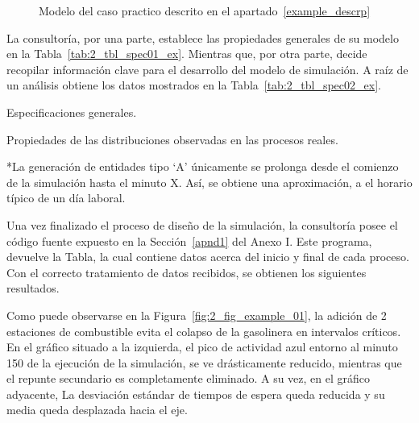 \begin{figure}
	\begin{center}
		
	\end{center}
	\caption{Modelo del caso practico descrito en el apartado~\ref{example_descrp}}
		\label{fig:2_fc_complex_ex}
\end{figure}

La consultoría, por una parte, establece
las propiedades generales de su modelo en la Tabla~\ref{tab:2_tbl_spec01_ex}.
Mientras que, por otra parte, decide recopilar información clave
para el desarrollo del modelo de simulación.
A raíz de un análisis obtiene los datos mostrados en la Tabla~\ref{tab:2_tbl_spec02_ex}.

\begin{table}
	\centering
	\caption{Especificaciones generales.}
	
	\label{tab:2_tbl_spec01_ex}
\end{table}
	
\begin{table}
	\centering
	\caption{Propiedades de las distribuciones observadas en las procesos reales.}
	
	\footnotesize{*La generación de entidades tipo `A' únicamente se prolonga desde el comienzo de la simulación hasta el minuto X.
	Así, se obtiene una aproximación, a el horario típico de un día laboral.}
	\label{tab:2_tbl_spec02_ex}
\end{table}

Una vez finalizado el proceso de diseño de la simulación,
la consultoría posee el código fuente expuesto en la
Sección~\ref{apnd1} del Anexo I.
Este programa, devuelve la Tabla,
la cual contiene datos acerca del inicio y final de cada proceso.
Con el correcto tratamiento de datos recibidos,
se obtienen los siguientes resultados.

Como puede observarse en la Figura~\ref{fig:2_fig_example_01},
la adición de 2 estaciones de combustible
evita el colapso de la gasolinera en intervalos críticos.
En el gráfico situado a la izquierda,
el pico de actividad azul entorno al minuto 150 de la ejecución de la simulación,
se ve drásticamente reducido, mientras que el repunte secundario es completamente eliminado.
A su vez, en el gráfico adyacente,
La desviación estándar de tiempos de espera queda reducida
y su media queda desplazada hacia el eje.

